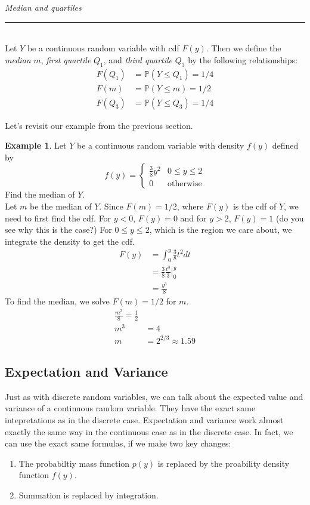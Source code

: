 \documentclass[12pt]{article}
\theoremstyle{definition}
\newtheorem*{example}{Example}
\theoremstyle{remark}
\def\P{{\mathbb P}}
\begin{document}
\begin{framed}
\emph{Median and quartiles}\\
  \rule{\dimexpr{}\fboxrule}{.1pt} \\
Let $Y$ be a continuous random variable with cdf $F(y)$. Then we define the \emph{median} $m$, \emph{first quartile} $Q_1$, and \emph{third quartile} $Q_3$ by the following relationships:
\begin{align*}
F(Q_1) &= \P(Y \leq Q_1) = 1/4\\
F(m) &= \P(Y \leq m) = 1/2\\
F(Q_3) &= \P(Y \leq Q_3) = 1/4
\end{align*}
\end{framed}

Let's revisit our example from the previous section.

\begin{example}
Let $Y$ be a continuous random variable with density $f(y)$ defined by
\[
f(y) = \begin{cases}
\frac{3}{8} y^2 & 0 \leq y\leq 2\\
0 & \text{otherwise}
\end{cases}
\]
Find the median of $Y$.\\

Let $m$ be the median of $Y$. Since $F(m) = 1/2$, where $F(y)$ is the cdf of $Y$, we need to first find the cdf. For $y < 0$, $F(y) = 0$ and for $y > 2$, $F(y) = 1$ (do you see why this is the case?) For $0 \leq y \leq 2$, which is the region we care about, we integrate the density to get the cdf.
\begin{align*}
F(y) &= \int_0^y \frac{3}{8} t^2 dt \\
&= \frac{3}{8} \frac{t^3}{3}\Bigr|_0^y \\
&= \frac{y^3}{8}
\end{align*}
To find the median, we solve $F(m) = 1/2$ for $m$.
\begin{align*}
\frac{m^3}{8} = \frac{1}{2} \\
m^3 &= 4 \\
m &= 2^{2/3} \approx 1.59
\end{align*}
\end{example}

\subsection{Expectation and Variance}
Just as with discrete random variables, we can talk about the expected value and variance of a continuous random variable. They have the exact same intepretations as in the discrete case. Expectation and variance work almost exactly the same way in the continuous case as in the discrete case. In fact, we can use the exact same formulas, if we make two key changes:
\begin{enumerate}
\item The probabiltiy mass function $p(y)$ is replaced by the proability density function $f(y)$.
\item Summation is replaced by integration.
\end{enumerate}
\end{document}
